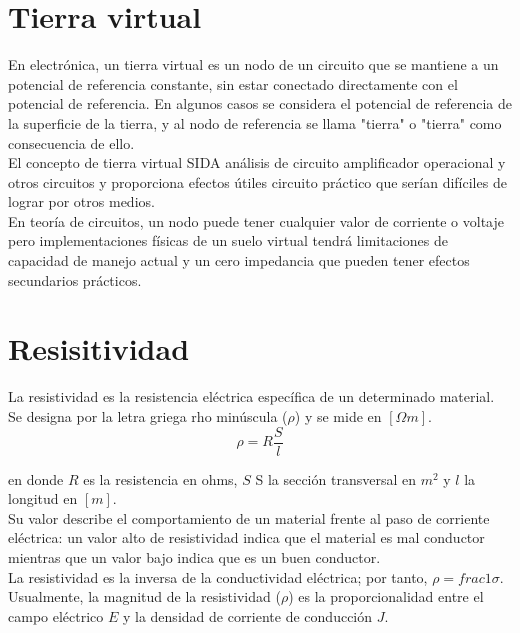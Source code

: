 \documentclass{article}
\begin{document}
\section{Tierra virtual}

En electrónica, un tierra virtual es un nodo de un circuito que se mantiene a un potencial de referencia constante, sin estar conectado directamente con el potencial de referencia. En algunos casos se considera el potencial de referencia de la superficie de la tierra, y al nodo de referencia se llama "tierra" o "tierra" como consecuencia de ello.\citep{TieV}\\

El concepto de tierra virtual SIDA análisis de circuito amplificador operacional y otros circuitos y proporciona efectos útiles circuito práctico que serían difíciles de lograr por otros medios.\citep{TieV}\\

En teoría de circuitos, un nodo puede tener cualquier valor de corriente o voltaje pero implementaciones físicas de un suelo virtual tendrá limitaciones de capacidad de manejo actual y un cero impedancia que pueden tener efectos secundarios prácticos.\citep{TieV}\\

\section{Resisitividad}

La resistividad es la resistencia eléctrica específica de un determinado material. Se designa por la letra griega rho minúscula ($\rho$) y se mide en $[\Omega m]$.\citep{Res}\\

\begin{equation}
    \rho=R\frac{S}{l}
\end{equation}


en donde $R$ es la resistencia en ohms, $S$ S la sección transversal en $m^2$ y $l$ la longitud en $[m]$.\citep{Res}\\

Su valor describe el comportamiento de un material frente al paso de corriente eléctrica: un valor alto de resistividad indica que el material es mal conductor mientras que un valor bajo indica que es un buen conductor.\citep{Res}\\

La resistividad es la inversa de la conductividad eléctrica; por tanto, $\rho=frac{1}{\sigma}$. Usualmente, la magnitud de la resistividad 
($\rho$) es la proporcionalidad entre el campo eléctrico $E$ y la densidad de corriente de conducción $J$.\citep{Res}\\
\end{document}
